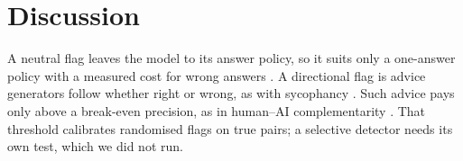 \section{Discussion}
\label{sec:discussion}

A neutral flag leaves the model to its answer policy, so it suits only a one-answer policy with a measured cost for
wrong answers \citep{wen2025abstention}. A directional flag is advice generators follow whether
right or wrong, as with sycophancy \citep{sharma2024sycophancy}. Such advice pays only above a break-even precision, as in
human--AI complementarity \citep{bansal2021accurate,mozannar2020defer}. That threshold calibrates randomised flags on
true pairs; a selective detector needs its own test, which we did not run.

